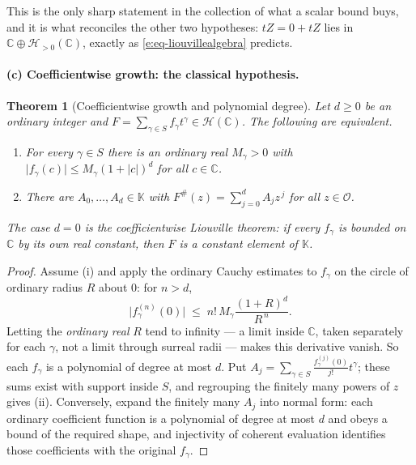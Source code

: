 \documentclass[11pt,a4paper]{article}
\numberwithin{equation}{section}
\newtheorem{theorem}{Theorem}[section]
\theoremstyle{definition}
\theoremstyle{remark}
\theoremstyle{plain}
\newcommand{\K}{\mathbb K}
\newcommand{\CC}{\mathbb C}
\newcommand{\Ov}{\mathcal O}
\newcommand{\tm}{t}
\newcommand{\ev}[1]{#1^{\#}}
\newcommand{\Hc}{\mathcal H}
\newcommand{\abs}[1]{\lvert #1\rvert}
\begin{document}
This is the only sharp statement in the collection of what a scalar bound
buys, and it is what reconciles the other two hypotheses:
$\tm Z=0+\tm Z$ lies in $\CC\oplus\Hc_{>0}(\CC)$, exactly as
\eqref{e:eq-liouvillealgebra} predicts.

\paragraph{(c) Coefficientwise growth: the classical hypothesis.}

\begin{theorem}[Coefficientwise growth and polynomial degree]
\label{e:thm-coeffliouville}
Let $d\ge0$ be an ordinary integer and $F=\sum_{\gamma\in S}f_\gamma\tm^\gamma
\in\Hc(\CC)$.  The following are equivalent.
\begin{enumerate}[label=\textup{(\roman*)}]
\item For every $\gamma\in S$ there is an ordinary real $M_\gamma>0$ with
      $\abs{f_\gamma(c)}\le M_\gamma(1+\abs c)^d$ for all $c\in\CC$.
\item There are $A_0,\dots,A_d\in\K$ with
      $\ev F(z)=\sum_{j=0}^{d}A_jz^{\,j}$ for all $z\in\Ov$.
\end{enumerate}
The case $d=0$ is the coefficientwise Liouville theorem: if every
$f_\gamma$ is bounded on $\CC$ by its own real constant, then $F$ is a
constant element of $\K$.
\end{theorem}

\begin{proof}
Assume (i) and apply the ordinary Cauchy estimates to $f_\gamma$ on the
circle of ordinary radius $R$ about $0$: for $n>d$,
\[
 \abs{f_\gamma^{(n)}(0)}\;\le\;n!\,M_\gamma\frac{(1+R)^d}{R^{\,n}} .
\]
Letting the \emph{ordinary real} $R$ tend to infinity --- a limit inside
$\CC$, taken separately for each $\gamma$, not a limit through surreal
radii --- makes this derivative vanish.  So each $f_\gamma$ is a
polynomial of degree at most $d$.  Put
$A_j=\sum_{\gamma\in S}\frac{f_\gamma^{(j)}(0)}{j!}\tm^{\gamma}$; these
sums exist with support inside $S$, and regrouping the finitely many
powers of $z$ gives (ii).  Conversely, expand the finitely many $A_j$ into
normal form: each ordinary coefficient function is a polynomial of degree
at most $d$ and obeys a bound of the required shape, and injectivity of
coherent evaluation identifies those coefficients with the original
$f_\gamma$.
\end{proof}
\end{document}

